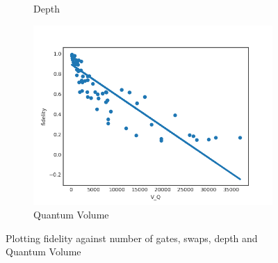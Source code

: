 \documentclass[11pt]{article}
\begin{document}
\begin{figure}[H]
\begin{subfigure}[b]{0.5\linewidth}
    \caption{Depth} 
    \label{fig:f_d_3000} 
  \end{subfigure}%
  \begin{subfigure}[b]{0.5\linewidth}
    \centering
    \includegraphics[width=0.75\linewidth]{f_q_3000_0_005} 
    \caption{Quantum Volume} 
    \label{fig:f_q_3000} 
  \end{subfigure} 
  \caption{Plotting fidelity against number of gates, swaps, depth and Quantum Volume}
  \label{fig:f_3000} 
\end{figure}
\end{document}
